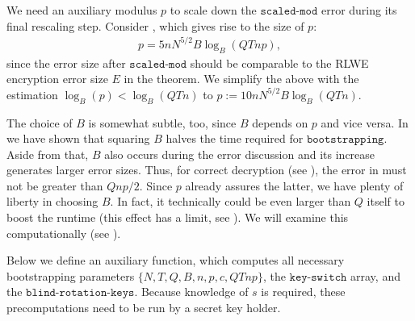 \documentclass[letterpaper,10pt,english]{jupyterBook}
\begin{document}
\sphinxAtStartPar
We need an auxiliary modulus \(p\) to scale down the \(\texttt{scaled-mod}\) error during its final rescaling step.
Consider {\hyperref[\detokenize{Thesis:error-size-after-scaled-mod}]{}}, which gives rise to the size of \(p\):
\begin{equation*}
\begin{split}p = 5 n N^{5/2} B \log_B(QTnp),\end{split}
\end{equation*}
\sphinxAtStartPar
since the error size after \(\texttt{scaled-mod}\) should be comparable to the RLWE encryption error size \(E\) in the theorem.
We simplify the above with the estimation \(\log_B(p) < \log_B(QTn)\) to \(p := 10 n N^{5/2} B\log_B(QTn)\).

\begin{DUlineblock}{0em}
\item[] 
\end{DUlineblock}

\sphinxAtStartPar
The choice of \(B\) is somewhat subtle, too, since \(B\) depends on \(p\) and vice versa.
In {\hyperref[\detokenize{Thesis:complexity-of-scaled-mod}]{}} we have shown that squaring \(B\) halves the time required for \(\texttt{bootstrapping}\).
Aside from that, \(B\) also occurs during the error discussion and its increase generates larger error sizes.
Thus, for correct decryption (see {\hyperref[\detokenize{Thesis:correct-BFV-decryption}]{}}), the error in {\hyperref[\detokenize{Thesis:error-size-after-scaled-mod}]{}} must not be greater than \(Qnp/2\).
Since \(p\) already assures the latter, we have plenty of liberty in choosing \(B\).
In fact, it technically could be even larger than \(Q\) itself to boost the runtime (this effect has a limit, see {\hyperref[\detokenize{Thesis:ciphertext-modulus-q}]{}}).
We will examine this computationally (see {\hyperref[\detokenize{Thesis:runtime-analysis}]{}}).

\begin{DUlineblock}{0em}
\item[] 
\end{DUlineblock}

\sphinxAtStartPar
Below we define an auxiliary function, which computes all necessary bootstrapping parameters \(\{N,T,Q,B,n,p,c,QTnp\}\), the \(\texttt{key-switch}\) array, and the \(\texttt{blind-rotation-keys}\).
Because knowledge of \(s\) is required, these precomputations need to be run by a secret key holder.
\end{document}
